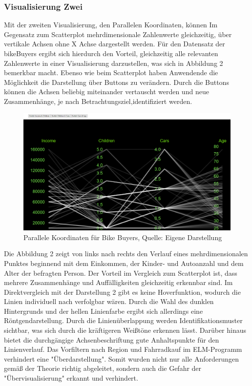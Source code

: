 \documentclass[usegeometry=true]{scrartcl}
\begin{document}
\subsubsection{Visualisierung Zwei}
Mit der zweiten Visualisierung, den Parallelen Koordinaten, können Im Gegensatz zum Scatterplot mehrdimensionale Zahlenwerte gleichzeitig, über vertikale Achsen ohne X Achse dargestellt werden.
Für den Datensatz der bikeBuyers ergibt sich hierdurch den Vorteil, gleichzeitig alle relevanten Zahlenwerte in einer Visualisierung darzustellen, was sich in Abbildung 2 bemerkbar macht. Ebenso wie beim Scatterplot haben Anwendende die Möglichkeit die Darstellung über Buttons zu verändern. Durch die Buttons können die Achsen beliebig miteinander vertauscht werden und neue Zusammenhänge, je nach Betrachtungsziel,identifiziert werden. 
\begin{figure}[h]
\begin{center}
\includegraphics[width=16cm]{Bilder/ParallelCoords.png}
\caption{Parallele Koordinaten für Bike Buyers, Quelle: Eigene Darstellung}
\end{center}
\end{figure}
\newline
Die Abbildung 2 zeigt von links nach rechts den Verlauf eines mehrdimensionalen Punktes beginnend mit dem Einkommen, der Kinder- und Autoanzahl und dem Alter der befragten Person. Der Vorteil im Vergleich zum Scatterplot ist, dass mehrere Zusammenhänge und Auffälligkeiten gleichzeitig erkennbar sind. Im Direktvergleich mit der Darstellung 2 gibt es keine Hoverfunktion, wodurch die Linien individuell nach verfolgbar wären. Durch die Wahl des dunklen Hintergrunds und der hellen Linienfarbe ergibt sich allerdings eine Röntgendarstellung. Durch die Linienüberlappung werden Identifikationsmuster sichtbar, was sich durch die kräftigeren Weißtöne erkennen lässt. Darüber hinaus bietet die durchgängige Achsenbeschriftung gute Anhaltspunkte für den Linienverlauf. Das Vorfiltern nach Region und Fahrradkauf im ELM-Programm verhindert eine "Überdarstellung".  Somit wurden nicht nur alle Anforderungen gemäß der Theorie richtig abgeleitet, sondern auch die Gefahr der "Übervisualisierung" erkannt und verhindert.
\end{document}
